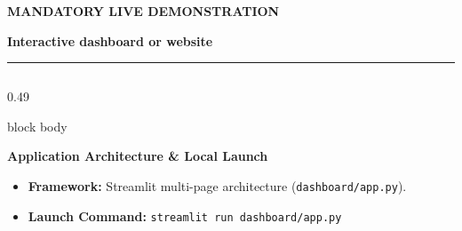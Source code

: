 \documentclass[aspectratio=169, 10pt]{beamer}
\newcommand{\slideheader}[3]{%
        \vspace{-0.25cm}%
        \noindent\begin{minipage}[t]{0.88\linewidth}%
            {\fontsize{7pt}{8.5pt}\selectfont \textbf{\color{BlueAccent}#1}}\par\vspace{1pt}%
            {\fontsize{11.5pt}{13.5pt}\selectfont \textbf{\color{NavyPrimary}#2}}%
        \end{minipage}%
        \hfill%
        \begin{minipage}[t]{0.10\linewidth}%
            \raggedleft{\fontsize{12pt}{14pt}\selectfont \textbf{\color{CoralAccent}#3}}%
        \end{minipage}\par%
        \vspace{2pt}%
        \textcolor{CardBorder}{\rule{\linewidth}{0.6pt}}\par%
        \vspace{3pt}%
    }
\newenvironment{card}[1][]{%
        \begin{beamercolorbox}[rounded=true,shadow=false,wd=\linewidth,sep=3.5pt,#1]{block body}%
        \fontsize{7.8pt}{9.8pt}\selectfont%
    }{%
        \end{beamercolorbox}%
    }
\begin{document}
    \begin{frame}[t]                                                                                                                                                                                   
        \slideheader{MANDATORY LIVE DEMONSTRATION}{Interactive dashboard or website}{15}                                                                                                               
        \begin{columns}[T]                                                                                                                                                                             
            \begin{column}{0.49\textwidth}                                                                                                                                                             
                \begin{card}                                                                                                                                                                           
                    \textbf{\color{NavyPrimary}Application Architecture \& Local Launch}\\[0.03cm]                                                                                                     
                    \begin{itemize}\setlength{\itemsep}{1.2pt}                                                                                                                                         
                        \item \textbf{Framework:} Streamlit multi-page architecture (\texttt{dashboard/app.py}).                                                                                       
                        \item \textbf{Launch Command:} \texttt{streamlit run dashboard/app.py}                                                                                                         

\end{itemize}
\end{card}
\end{column}
\end{columns}
\end{frame}
\end{document}
